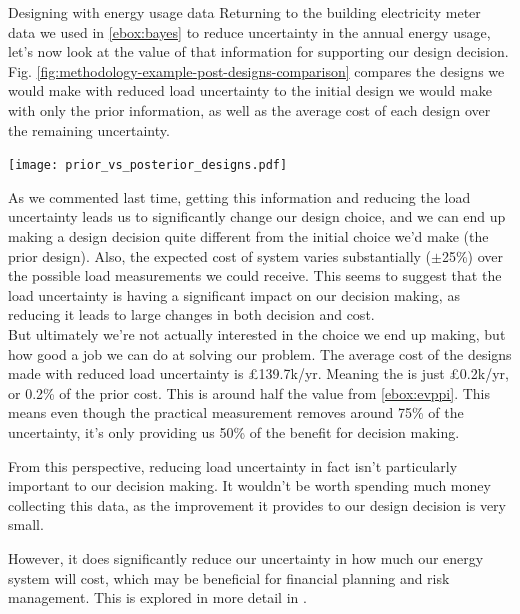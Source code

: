\begin{ebox}{Designing with energy usage data}
    Returning to the building electricity meter data we used in \ref{ebox:bayes} to reduce uncertainty in the annual energy usage, let's now look at the value of that information for supporting our design decision. Fig. \ref{fig:methodology-example-post-designs-comparison} compares the designs we would make with reduced load uncertainty to the initial design we would make with only the prior information, as well as the average cost of each design over the remaining uncertainty.

    {
        \centering
        \texttt{[image: prior\_vs\_posterior\_designs.pdf]}
        \vspace*{-0.25cm}
        \label{fig:methodology-example-post-designs-comparison}
    }
    \bigskip

    As we commented last time, getting this information and reducing the load uncertainty leads us to significantly change our design choice, and we can end up making a design decision quite different from the initial choice we'd make (the prior design). Also, the expected cost of system varies substantially ($\pm$25\%) over the possible load measurements we could receive. This seems to suggest that the load uncertainty is having a significant impact on our decision making, as reducing it leads to large changes in both decision and cost.\\

    But ultimately we're not actually interested in the choice we end up making, but how good a job we can do at solving our problem. The average cost of the designs made with reduced load uncertainty is £139.7k/yr. Meaning the  is just £0.2k/yr, or 0.2\% of the prior cost. This is around half the  value from \ref{ebox:evppi}. This means even though the practical measurement removes around 75\% of the uncertainty, it's only providing us 50\% of the benefit for decision making.

    From this perspective, reducing load uncertainty in fact isn't particularly important to our decision making. It wouldn't be worth spending much money collecting this data, as the improvement it provides to our design decision is very small.

    However, it does significantly reduce our uncertainty in how much our energy system will cost, which may be beneficial for financial planning and risk management. This is explored in more detail in .
\end{ebox}\


